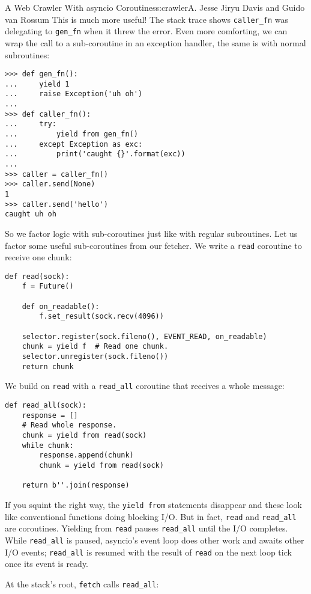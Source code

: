 \begin{aosachapter}{A Web Crawler With asyncio Coroutines}{s:crawler}{A. Jesse Jiryu Davis and Guido van Rossum}
This is much more useful! The stack trace shows \texttt{caller\_fn} was
delegating to \texttt{gen\_fn} when it threw the error. Even more
comforting, we can wrap the call to a sub-coroutine in an exception
handler, the same is with normal subroutines:

\begin{verbatim}
>>> def gen_fn():
...     yield 1
...     raise Exception('uh oh')
...
>>> def caller_fn():
...     try:
...         yield from gen_fn()
...     except Exception as exc:
...         print('caught {}'.format(exc))
...
>>> caller = caller_fn()
>>> caller.send(None)
1
>>> caller.send('hello')
caught uh oh
\end{verbatim}

So we factor logic with sub-coroutines just like with regular
subroutines. Let us factor some useful sub-coroutines from our fetcher.
We write a \texttt{read} coroutine to receive one chunk:

\begin{verbatim}
def read(sock):
    f = Future()

    def on_readable():
        f.set_result(sock.recv(4096))

    selector.register(sock.fileno(), EVENT_READ, on_readable)
    chunk = yield f  # Read one chunk.
    selector.unregister(sock.fileno())
    return chunk
\end{verbatim}

We build on \texttt{read} with a \texttt{read\_all} coroutine that
receives a whole message:

\begin{verbatim}
def read_all(sock):
    response = []
    # Read whole response.
    chunk = yield from read(sock)
    while chunk:
        response.append(chunk)
        chunk = yield from read(sock)

    return b''.join(response)
\end{verbatim}

If you squint the right way, the \texttt{yield from} statements
disappear and these look like conventional functions doing blocking I/O.
But in fact, \texttt{read} and \texttt{read\_all} are coroutines.
Yielding from \texttt{read} pauses \texttt{read\_all} until the I/O
completes. While \texttt{read\_all} is paused, asyncio's event loop does
other work and awaits other I/O events; \texttt{read\_all} is resumed
with the result of \texttt{read} on the next loop tick once its event is
ready.

At the stack's root, \texttt{fetch} calls \texttt{read\_all}:


\end{aosachapter}
